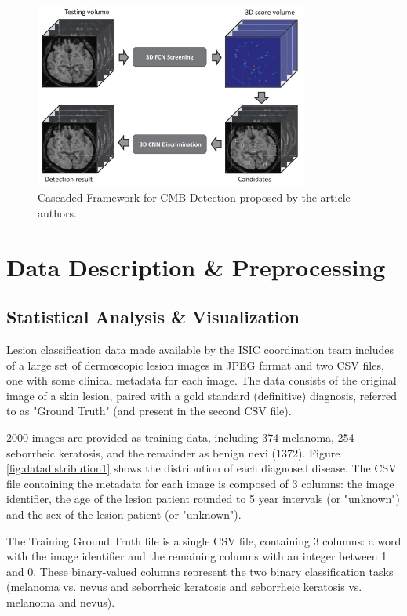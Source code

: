\documentclass[10pt]{IEEEtran}
\begin{document}
\begin{figure}[H]
\centering
\includegraphics[width=9cm]{CMBDetection_CascadeFramework.jpg}
\caption{Cascaded Framework for CMB Detection proposed by the article authors.}
\end{figure}
\newpage{}

\section{\textbf{Data Description \& Preprocessing}} %

\subsection{Statistical Analysis \& Visualization}

Lesion classification data made available by the ISIC coordination team includes of a large set of dermoscopic lesion images in JPEG format and two CSV files, one with some clinical metadata for each image. 
The data consists of the original image of a skin lesion, paired with a gold standard (definitive) diagnosis, referred to as "Ground Truth" (and present in the second CSV file).

2000 images are provided as training data, including 374 melanoma, 254 seborrheic keratosis, and the remainder as benign nevi (1372).
Figure \ref{fig:datadistribution1} shows the distribution of each diagnosed disease.
The CSV file containing the metadata for each image is composed of 3 columns: the image identifier, the age of the lesion patient rounded to 5 year intervals (or "unknown") and the sex of the lesion patient (or "unknown").

The Training Ground Truth file is a single CSV file, containing 3 columns: a word with the image identifier and the remaining columns with an integer between 1 and 0.
These binary-valued columns represent the two binary classification tasks (melanoma vs. nevus and seborrheic keratosis and seborrheic keratosis vs. melanoma and nevus).
\end{document}
